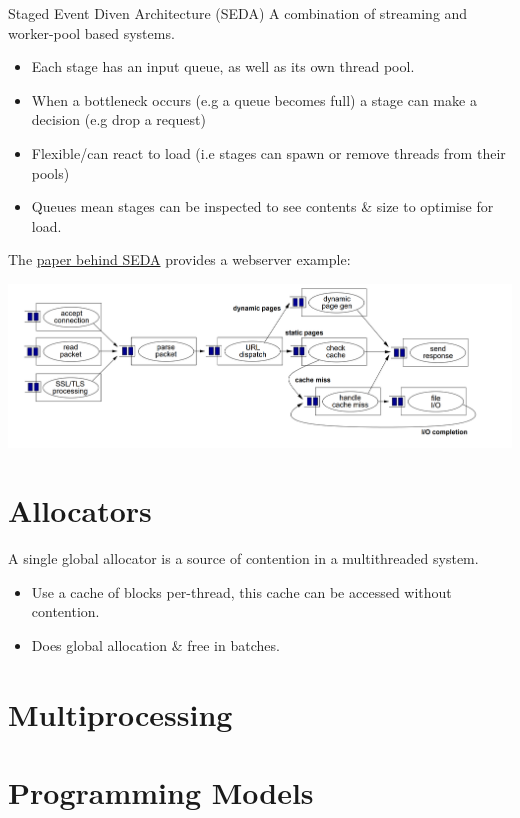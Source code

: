 \begin{definitionbox}{Staged Event Diven Architecture (SEDA)}
    A combination of streaming and worker-pool based systems.
    \begin{itemize}
        \item Each stage has an input queue, as well as its own thread pool.
        \item When a bottleneck occurs (e.g a queue becomes full) a stage can make a decision (e.g drop a request)
        \item Flexible/can react to load (i.e stages can spawn or remove threads from their pools)
        \item Queues mean stages can be inspected to see contents \& size to optimise for load.
    \end{itemize}
    The \href{https://web.archive.org/web/20120704004128/http://www.eecs.harvard.edu/~mdw/papers/mdw-phdthesis.pdf}{paper behind SEDA} provides a webserver example:
    \begin{center}
        \includegraphics[width=.9\textwidth]{parallelism/images/SEDA.png}
    \end{center}
\end{definitionbox}

\section{Allocators}
A single global allocator is a source of contention in a multithreaded system.
\begin{itemize}
    \item Use a cache of blocks per-thread, this cache can be accessed without contention.
    \item Does global allocation \& free in batches. 
\end{itemize}

\section{Multiprocessing}
\unfinished

\section{Programming Models}
\unfinished


